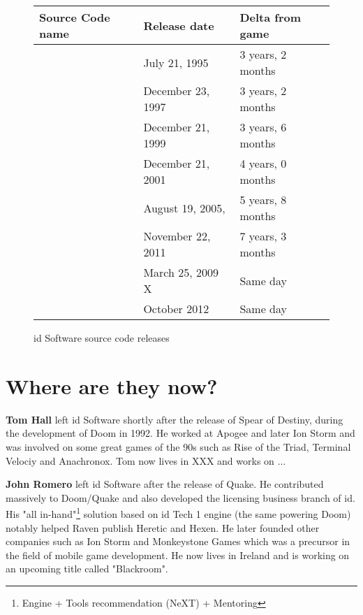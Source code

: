  \begin{figure}[H]
\centering  
\begin{tabularx}{\textwidth}{ X  Y  Y}
  \toprule
  \textbf{Source Code name} &  \textbf{Release date} & \textbf{Delta from game}\\ 
  \toprule {} & July 21, 1995 & 3 years, 2 months\\ 
            & December 23, 1997 & 3 years, 2 months\\ 
            & December 21, 1999 & 3 years, 6 months\\ 
            & December 21, 2001 & 4 years, 0 months \\ 
            & August 19, 2005, & 5 years, 8 months\\ 
            & November 22, 2011 & 7 years, 3 months\\ 
            &  March 25, 2009 X & Same day \\ 
            & October 2012 & Same day \\  
  \toprule
\end{tabularx}
\caption{id Software source code releases}\label{fig:vga_history}
\end{figure}


\section{Where are they now?}

\textbf{Tom Hall} left id Software shortly after the release of Spear of Destiny, during the development of Doom in 1992. He worked at Apogee and later Ion Storm and was involved on some great games of the 90s such as Rise of the Triad, Terminal Velociy and Anachronox. Tom now lives in XXX and works on ...\\
\par

\textbf{John Romero} left id Software after the release of Quake. He contributed massively to Doom/Quake and also developed the licensing business branch of id. His "all in-hand"\footnote{Engine + Tools recommendation (NeXT) + Mentoring} solution based on id Tech 1 engine (the same powering Doom) notably helped Raven publish Heretic and Hexen. He later founded other companies such as Ion Storm and Monkeystone Games which was a precursor in the field of mobile game development. He now lives in Ireland and is working on an upcoming title called "Blackroom".\\
\par

